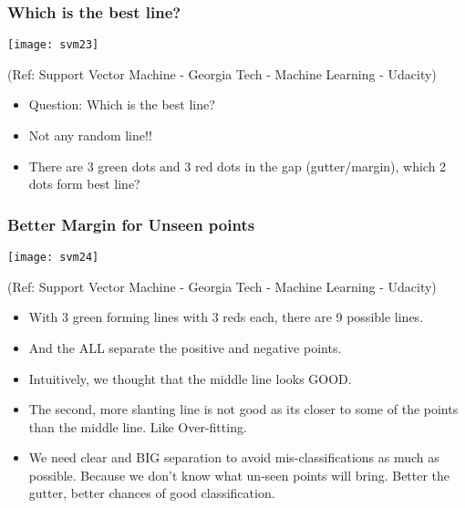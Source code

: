 \begin{frame}[fragile] \frametitle{Which is the best line?}
\begin{center}
\texttt{[image: svm23]}

\tiny{(Ref: Support Vector Machine - Georgia Tech - Machine Learning - Udacity)}
\end{center}


\begin{itemize}
\item Question: Which is the best line?
\item Not any random line!!
\item There are 3 green dots and 3 red dots in the gap (gutter/margin), which 2 dots form best line?
\end{itemize}
\end{frame}

\begin{frame}[fragile] \frametitle{Better Margin for Unseen points}
\begin{center}
\texttt{[image: svm24]}

\tiny{(Ref: Support Vector Machine - Georgia Tech - Machine Learning - Udacity)}
\end{center}


\begin{itemize}
\item With 3 green forming lines with 3 reds each, there are 9 possible lines.
\item And the ALL separate the positive and negative points.
\item Intuitively, we thought that the middle line looks GOOD.
\item The second, more slanting line is not good as its closer to some of the points than the middle line. Like Over-fitting.
\item We need clear and BIG separation to avoid mis-classifications as much as possible. Because we don't know what un-seen points will bring. Better the gutter, better chances of good classification.
\end{itemize}
\end{frame}


